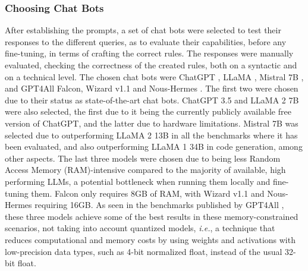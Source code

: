 \documentclass[sigconf]{acmart}
\begin{document}
\subsubsection{Choosing Chat Bots}
After establishing the prompts, a set of chat bots were selected to test their responses to the different queries, as to evaluate their capabilities, before any fine-tuning, in terms of crafting the correct rules. The responses were manually evaluated, checking the correctness of the created rules, both on a syntactic and on a technical level. The chosen chat bots were ChatGPT \cite{OpenAI22}, LLaMA \cite{Meta23}, Mistral 7B \cite{Jiang23}, and GPT4All Falcon, Wizard v1.1 and Nous-Hermes \cite{Anand23}. The first two were chosen due to their status as state-of-the-art chat bots. ChatGPT 3.5 and LLaMA 2 7B were also selected, the first due to it being the currently publicly available free version of ChatGPT, and the latter due to hardware limitations. Mistral 7B was selected due to outperforming LLaMA 2 13B in all the benchmarks where it has been evaluated, and also outperforming LLaMA 1 34B in code generation, among other aspects. The last three models were chosen due to being less Random Access Memory (RAM)-intensive compared to the majority of available, high performing LLMs, a potential bottleneck when running them locally and fine-tuning them. Falcon only requires 8GB of RAM, with Wizard v1.1 and Nous-Hermes requiring 16GB. As seen in the benchmarks published by GPT4All \cite{Anand23}, these three models achieve some of the best results in these memory-constrained scenarios, not taking into account quantized models, \textit{i.e.}, a technique that reduces computational and memory costs by using weights and activations with low-precision data types, such as 4-bit normalized float, instead of the usual 32-bit float.
\end{document}
